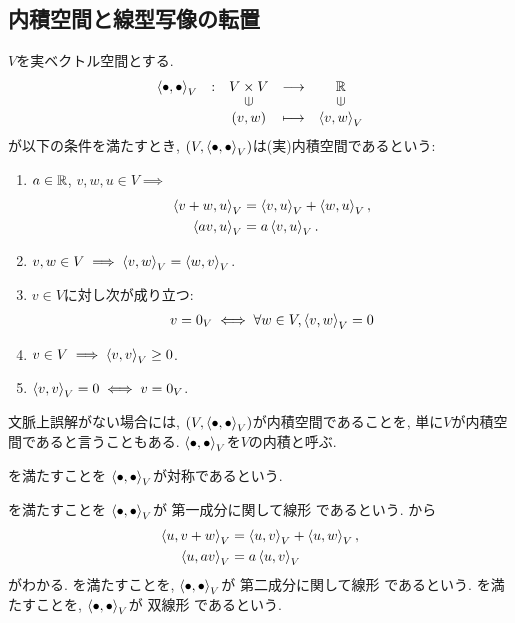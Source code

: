 \subsection{内積空間と線型写像の転置}
\begin{definition}
  $V$を実ベクトル空間とする.
  \begin{align*}
    \shazo{\Braket{\bullet,\bullet}_V}
          {V\times V}{\RR}
          {(v,w)}{\Braket{v,w}_V}
  \end{align*}
  が以下の条件を満たすとき,
  $(V,\Braket{\bullet,\bullet}_V)$は(実)内積空間であるという:
  \begin{enumerate}
  \item
    \label{def:inner:item:line}
    $a\in\mathbb{R}$, $v,w,u\in V\implies$
    \begin{align}
      \Braket{v+w,u}_V&=\Braket{v,u}_V+\Braket{w,u}_V,
      \label{def:inner:item:line:1:sum}
      \\
      \Braket{av,u}_V&=a\Braket{v,u}_V.
      \label{def:inner:item:line:1:sca}
    \end{align}
  \item
    \label{def:inner:item:sym}
    $v,w\in V \implies \Braket{v,w}_V=\Braket{w,v}_V$.
  \item 
    \label{def:inner:item:nondege}
    $v\in V$に対し次が成り立つ:
    \begin{align}
      v=0_V
      \iff
      \forall w\in V,\Braket{v,w}_V=0
      \label{def:inner:item:nondege:1}
    \end{align}
  \item
    \label{def:inner:item:semi}
    $v\in V \implies \Braket{v,v}_V\geq 0$.
  \item
    \label{def:inner:item:posi}
    $\Braket{v,v}_V=0\iff v=0_V$.
  \end{enumerate}
\end{definition}
\begin{remark}
  文脈上誤解がない場合には,
  $(V,\Braket{\bullet,\bullet}_V)$が内積空間であることを,
  単に$V$が内積空間であると言うこともある.
  $\Braket{\bullet,\bullet}_V$を$V$の内積と呼ぶ.
\end{remark}
\begin{remark}
  を満たすことを
  $\Braket{\bullet,\bullet}_V$が対称であるという.
\end{remark}
\begin{remark}
  を満たすことを
  $\Braket{\bullet,\bullet}_V$が
  第一成分に関して線形
  であるという.
  から
  \begin{align}
    \Braket{u,v+w}_V&=\Braket{u,v}_V+\Braket{u,w}_V,
    \label{def:inner:item:line:2:sum}
    \\
    \Braket{u,av}_V&=a\Braket{u,v}_V    
    \label{def:inner:item:line:2:sca}
  \end{align}
  がわかる.
  を満たすことを,
  $\Braket{\bullet,\bullet}_V$が
  第二成分に関して線形
  であるという.
  を満たすことを,
  $\Braket{\bullet,\bullet}_V$が
  双線形
  であるという.
\end{remark}
